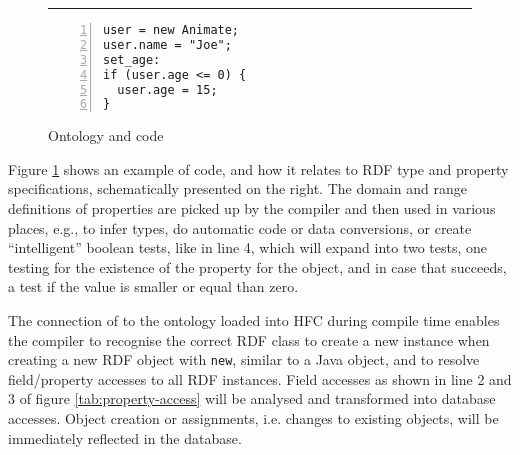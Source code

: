 \begin{figure}[htb]
\rule{7mm}{0pt}\begin{minipage}{0.45\columnwidth}
\small%
\begin{lstlisting}[numbers=left,numberstyle=\scriptsize]
user = new Animate;
user.name = "Joe";
set_age:
if (user.age <= 0) {
  user.age = 15;
}
\end{lstlisting}
\end{minipage}\vrule\hspace{1ex}
\begin{minipage}{0.44\columnwidth}
    \small{}
\end{minipage}
  \caption{Ontology and \vonda code}
  \label{fig:rdfobjects}
\end{figure}

Figure \ref{fig:rdfobjects} shows an example of \vonda code, and how it relates
to RDF type and property specifications, schematically presented on the right.
The domain and range definitions of properties are picked up by the compiler
and then used in various places, e.g., to infer types, do automatic code or
data conversions, or create ``intelligent'' boolean tests, like in line 4,
which will expand into two tests, one testing for the existence of the property
for the object, and in case that succeeds, a test if the value is smaller or
equal than zero.

The connection of \vonda to the ontology loaded into HFC during compile time
enables the compiler to recognise the correct RDF class to create a new
instance when creating a new RDF object with \texttt{new}, similar to a Java
object, and to resolve field/property accesses to all RDF instances. Field
accesses as shown in line 2 and 3 of figure \ref{tab:property-access} will be
analysed and transformed into database accesses. Object creation or
assignments, i.e. changes to existing objects, will be immediately reflected in
the database.


